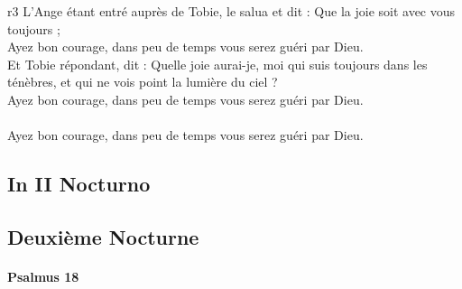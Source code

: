 \documentclass[twoside]{article}
\begin{document}
\begin{paracol}[1]{2}
{	}
	{r3}
	{\rr L’Ange étant entré auprès de Tobie, le salua et dit : Que la joie soit avec vous toujours ;\\
	\GreSpecial{*} Ayez bon courage, dans peu de temps vous serez guéri par Dieu.\\
	\vv Et Tobie répondant, dit : Quelle joie aurai-je, moi qui suis toujours dans les ténèbres, et qui ne vois point la lumière du ciel ?\\
	\GreSpecial{*} Ayez bon courage, dans peu de temps vous serez guéri par Dieu.\\
	\versetGloireAuPere{}\\
	\GreSpecial{*} Ayez bon courage, dans peu de temps vous serez guéri par Dieu.}

\subsection{In II Nocturno}

\switchcolumn

\subsection{Deuxième Nocturne}

\switchcolumn*

\paragraph{Psalmus 18}



\end{paracol}
\end{document}

